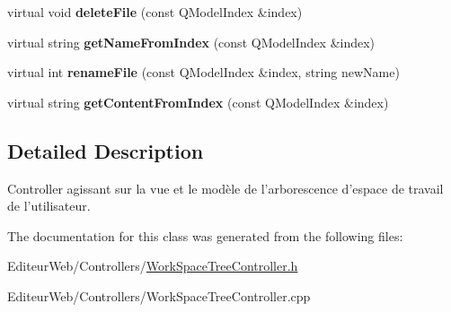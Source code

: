 \begin{DoxyCompactItemize}
\item 
\hypertarget{class_work_space_tree_controller_a1fbf696eb96aa38cb2eb4392f203cc28}{
virtual void {\bfseries deleteFile} (const QModelIndex \&index)}
\label{class_work_space_tree_controller_a1fbf696eb96aa38cb2eb4392f203cc28}

\item 
\hypertarget{class_work_space_tree_controller_a0165c865e5ec88abad5b761da7f50b66}{
virtual string {\bfseries getNameFromIndex} (const QModelIndex \&index)}
\label{class_work_space_tree_controller_a0165c865e5ec88abad5b761da7f50b66}

\item 
\hypertarget{class_work_space_tree_controller_a6620fc12a93a16661444b0dd2aed33d4}{
virtual int {\bfseries renameFile} (const QModelIndex \&index, string newName)}
\label{class_work_space_tree_controller_a6620fc12a93a16661444b0dd2aed33d4}

\item 
\hypertarget{class_work_space_tree_controller_a3cff3070586f4f62f329918381d8bf16}{
virtual string {\bfseries getContentFromIndex} (const QModelIndex \&index)}
\label{class_work_space_tree_controller_a3cff3070586f4f62f329918381d8bf16}

\end{DoxyCompactItemize}


\subsection{Detailed Description}
Controller agissant sur la vue et le modèle de l'arborescence d'espace de travail de l'utilisateur. 

The documentation for this class was generated from the following files:\begin{DoxyCompactItemize}
\item 
EditeurWeb/Controllers/\hyperlink{_work_space_tree_controller_8h}{WorkSpaceTreeController.h}\item 
EditeurWeb/Controllers/WorkSpaceTreeController.cpp\end{DoxyCompactItemize}
